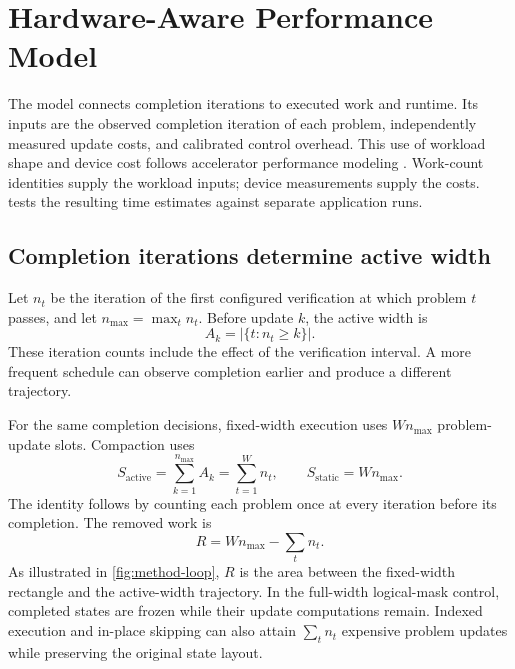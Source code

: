 \section{Hardware-Aware Performance Model}
\label{sec:cost-hypothesis}

The model connects completion iterations to executed work and runtime. Its inputs are the observed completion iteration of each problem, independently measured update costs, and calibrated control overhead. This use of workload shape and device cost follows accelerator performance modeling \citep{yu2021habitat,nvidia2022gpuperformance}. Work-count identities supply the workload inputs; device measurements supply the costs.  tests the resulting time estimates against separate application runs.

\subsection{Completion iterations determine active width}

Let $n_t$ be the iteration of the first configured verification at which problem $t$ passes, and let $n_{\max}=\max_t n_t$. Before update $k$, the active width is
\begin{equation}
A_k=\bigl|\{t:n_t\geq k\}\bigr|.
\label{eq:active-width}
\end{equation}
These iteration counts include the effect of the verification interval. A more frequent schedule can observe completion earlier and produce a different trajectory.

For the same completion decisions, fixed-width execution uses $Wn_{\max}$ problem-update slots. Compaction uses
\begin{equation}
S_{\mathrm{active}}=\sum_{k=1}^{n_{\max}}A_k=\sum_{t=1}^{W}n_t,
\qquad S_{\mathrm{static}}=Wn_{\max}.
\label{eq:update-count-identity}
\end{equation}
The identity follows by counting each problem once at every iteration before its completion. The removed work is
\begin{equation}
R=Wn_{\max}-\sum_t n_t.
\label{eq:removable-updates}
\end{equation}
As illustrated in \cref{fig:method-loop}, $R$ is the area between the fixed-width rectangle and the active-width trajectory. In the full-width logical-mask control, completed states are frozen while their update computations remain. Indexed execution and in-place skipping can also attain $\sum_t n_t$ expensive problem updates while preserving the original state layout.

